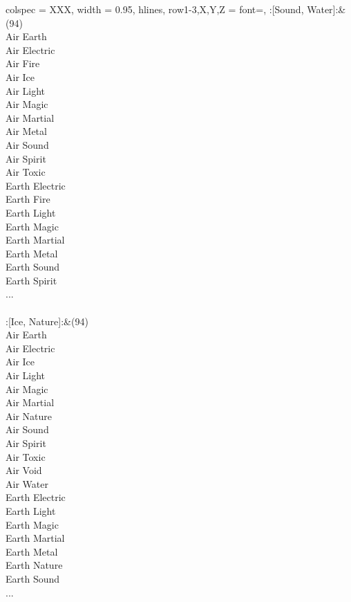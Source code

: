 \begin{longtblr}[
	caption = {2v2 Defending Weak},
	label = {2v2-Defending-Weak},
]{
	colspec = {XXX}, width = 0.95\linewidth,
	hlines,
	row{1-3,X,Y,Z} = {font=\bfseries},
}
	:[Sound, Water]:&{(94)\\
	Air Earth \\
	Air Electric \\
	Air Fire \\
	Air Ice \\
	Air Light \\
	Air Magic \\
	Air Martial \\
	Air Metal \\
	Air Sound \\
	Air Spirit \\
	Air Toxic \\
	Earth Electric \\
	Earth Fire \\
	Earth Light \\
	Earth Magic \\
	Earth Martial \\
	Earth Metal \\
	Earth Sound \\
	Earth Spirit \\
	...\\
	}\\

	:[Ice, Nature]:&{(94)\\
	Air Earth \\
	Air Electric \\
	Air Ice \\
	Air Light \\
	Air Magic \\
	Air Martial \\
	Air Nature \\
	Air Sound \\
	Air Spirit \\
	Air Toxic \\
	Air Void \\
	Air Water \\
	Earth Electric \\
	Earth Light \\
	Earth Magic \\
	Earth Martial \\
	Earth Metal \\
	Earth Nature \\
	Earth Sound \\
	...\\
	}\\


\end{longtblr}
